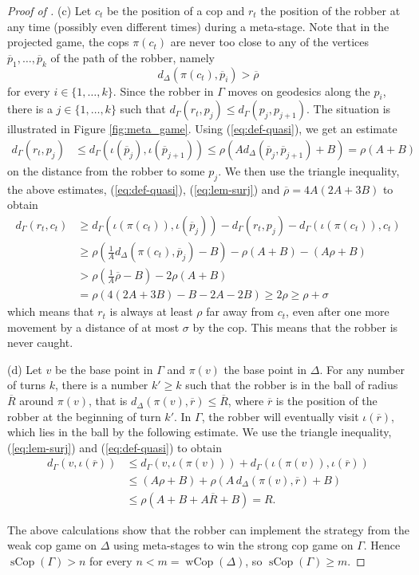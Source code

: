\documentclass[10pt,a4paper]{amsart}
\renewcommand{\geq}{\geqslant}
\renewcommand{\leq}{\leqslant}
\newcommand{\sCop}{\operatorname{sCop}}
\newcommand{\wCop}{\operatorname{wCop}}
\begin{document}
\begin{proof}[Proof of ]
(c) Let $c_t$ be the position of a cop and $r_t$ the position of the robber at any time (possibly even different times) during a meta-stage. Note that in the projected game, the cops $\pi(c_t)$ are never too close to any of the vertices $\overline{p}_1, \ldots , \overline{p}_k$ of the path of the robber, namely
$$
d_\Delta(\pi(c_t), \overline{p}_i) > \overline{\rho}
$$
for every $i \in \{1, \ldots, k\}$. Since the robber in $\Gamma$ moves on geodesics along the $p_i$, there is a $j \in \{1, \ldots, k\}$ such that $d_{\Gamma}(r_t, p_j) \leq d_{\Gamma}(p_j, p_{j+1})$. The situation is illustrated in Figure \ref{fig:meta_game}. Using (\ref{eq:def-quasi}), we get an estimate
\begin{align*}
    d_{\Gamma}(r_t, p_j)
    &\leq d_{\Gamma}(\iota(\overline{p}_j), \iota(\overline{p}_{j+1}))
     \leq \rho ( A d_\Delta(\overline{p}_j, \overline{p}_{j+1}) + B ) = \rho(A + B)
\end{align*}
on the distance from the robber to some $p_j$. We then use the triangle inequality, the above estimates, (\ref{eq:def-quasi}), (\ref{eq:lem-surj}) and $\overline{\rho} = 4A(2A + 3B)$ to obtain
\begin{align*}
    d_{\Gamma}(r_t, c_t) & \geq d_{\Gamma}(\iota (\pi (c_t)) , \iota(\overline{p}_j)) - d_{\Gamma}(r_t , p_j) - d_{\Gamma}(\iota(\pi(c_t)), c_t) \\
    & \geq \rho \left(\frac{1}{A} d_\Delta(\pi(c_t), \overline{p}_j) - B \right) - \rho (A + B) - (A\rho + B) \\
    & > \rho \left( \frac{1}{A} \overline{\rho} - B \right) - 2\rho(A+B) \\
    & = \rho ( 4(2A+3B) -B -2A -2B) \geq 2\rho \geq \rho + \sigma
\end{align*}
which means that $r_t$ is always at least $\rho$ far away from $c_t$, even after one more movement by a distance of at most $\sigma$ by the cop. This means that the robber is never caught.

(d) Let $v$ be the base point in $\Gamma$ and $\pi(v)$ the base point in $\Delta$.
For any number of turns $k$, there is a number $k' \geq k$ such that the robber is in the ball of radius $\overline{R}$ around $\pi(v)$, that is $d_\Delta(\pi(v), \overline{r}) \leq \overline{R}$, where $\overline{r}$ is the position of the robber at the beginning of turn $k'$. In $\Gamma$, the robber will eventually visit $\iota(\overline{r})$, which lies in the ball by the following estimate. We use the triangle inequality, (\ref{eq:lem-surj}) and (\ref{eq:def-quasi}) to obtain
\begin{align*}
    d_{\Gamma}(v,\iota(\overline{r})) & \leq d_{\Gamma}(v, \iota(\pi(v))) + d_{\Gamma}( \iota(\pi(v)), \iota(\overline{r}))  \\
    &\leq ( A\rho + B) + \rho(A \, d_\Delta(\pi(v),\overline{r}) + B) \\
    &
    \leq  \rho (A + B + A\overline{R} + B)= R.
\end{align*}


The above calculations show that the robber can implement the strategy from the weak cop game on $\Delta$ using meta-stages to win the strong cop game on $\Gamma$. Hence $\operatorname{sCop}(\Gamma) > n$ for every $n< m = \wCop(\Delta)$, so $\sCop(\Gamma) \geq m$.
\end{proof}
\end{document}
